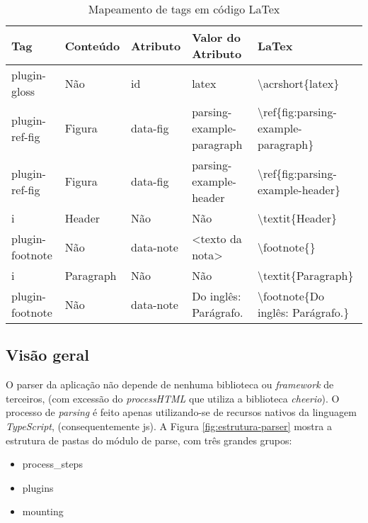 \begin{table}[H]
    \centering
    \caption{Mapeamento de tags em código LaTex}
    \label{tbl:plugins-latex-mapping}
    \renewcommand{\arraystretch}{1.5}
    \begin{tabular}{p{1.9200cm} p{1.9200cm} p{1.9200cm} p{3.2000cm} p{7.0400cm}}
        \hline
        \textbf{Tag} & \textbf{Conteúdo} & \textbf{Atributo} & \textbf{Valor do Atributo} & \textbf{LaTex} \\
        \hline
        plugin-gloss & Não & id & latex & \textbackslash acrshort\{latex\} \\
		plugin-ref-fig & Figura & data-fig & parsing-example-paragraph & \textbackslash ref\{fig:parsing-example-paragraph\} \\
		plugin-ref-fig & Figura & data-fig & parsing-example-header & \textbackslash ref\{fig:parsing-example-header\} \\
		i & Header & Não & Não & \textbackslash textit\{Header\} \\
		plugin-footnote & Não & data-note & <texto da nota> & \textbackslash footnote\{<texto da nota>\} \\
		i & Paragraph & Não & Não & \textbackslash textit\{Paragraph\} \\
		plugin-footnote & Não & data-note & Do inglês: Parágrafo. & \textbackslash footnote\{Do inglês: Parágrafo.\} \\
        \hline
        
    \end{tabular}
\end{table}

\subsection{Visão geral}

O parser da aplicação não depende de nenhuma biblioteca
ou \textit{framework} de terceiros,
(com excessão do \textit{processHTML} que utiliza a biblioteca \textit{cheerio}).
O processo de \textit{parsing} é feito
apenas utilizando-se de recursos nativos da linguagem
\textit{TypeScript}, (consequentemente
\acrshort{js}).
A
Figura \ref{fig:estrutura-parser}
mostra a estrutura de pastas do módulo de parse, com três grandes
grupos:

\begin{itemize}
        
	\item process\_steps
	\item plugins
	\item mounting
    
\end{itemize}

